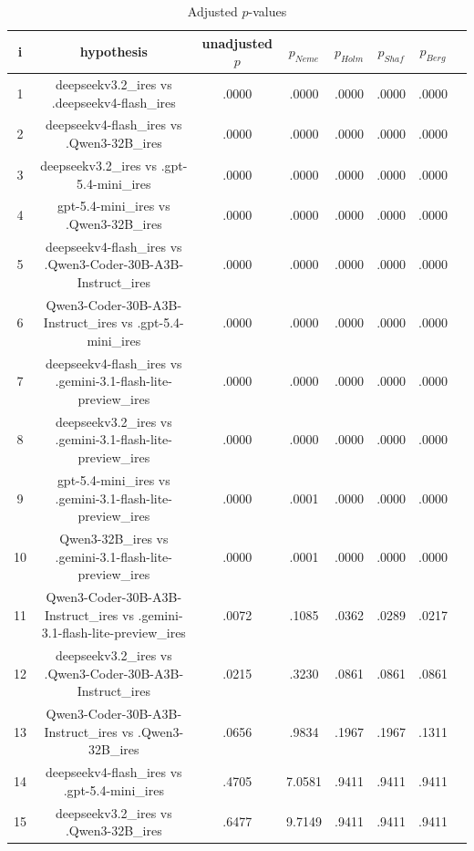 \documentclass[a4paper,10pt]{article}
\begin{document}
\begin{landscape}
\begin{table}[!htp]
\centering\tiny
\caption{Adjusted $p$-values}
\begin{tabular}{cccccccc}
i&hypothesis&unadjusted $p$&$p_{Neme}$&$p_{Holm}$&$p_{Shaf}$&$p_{Berg}$\\
\hline
1&deepseekv3.2_ires vs .deepseekv4-flash_ires&.0000&.0000&.0000&.0000&.0000\\2&deepseekv4-flash_ires vs .Qwen3-32B_ires&.0000&.0000&.0000&.0000&.0000\\3&deepseekv3.2_ires vs .gpt-5.4-mini_ires&.0000&.0000&.0000&.0000&.0000\\4&gpt-5.4-mini_ires vs .Qwen3-32B_ires&.0000&.0000&.0000&.0000&.0000\\5&deepseekv4-flash_ires vs .Qwen3-Coder-30B-A3B-Instruct_ires&.0000&.0000&.0000&.0000&.0000\\6&Qwen3-Coder-30B-A3B-Instruct_ires vs .gpt-5.4-mini_ires&.0000&.0000&.0000&.0000&.0000\\7&deepseekv4-flash_ires vs .gemini-3.1-flash-lite-preview_ires&.0000&.0000&.0000&.0000&.0000\\8&deepseekv3.2_ires vs .gemini-3.1-flash-lite-preview_ires&.0000&.0000&.0000&.0000&.0000\\9&gpt-5.4-mini_ires vs .gemini-3.1-flash-lite-preview_ires&.0000&.0001&.0000&.0000&.0000\\10&Qwen3-32B_ires vs .gemini-3.1-flash-lite-preview_ires&.0000&.0001&.0000&.0000&.0000\\11&Qwen3-Coder-30B-A3B-Instruct_ires vs .gemini-3.1-flash-lite-preview_ires&.0072&.1085&.0362&.0289&.0217\\12&deepseekv3.2_ires vs .Qwen3-Coder-30B-A3B-Instruct_ires&.0215&.3230&.0861&.0861&.0861\\13&Qwen3-Coder-30B-A3B-Instruct_ires vs .Qwen3-32B_ires&.0656&.9834&.1967&.1967&.1311\\14&deepseekv4-flash_ires vs .gpt-5.4-mini_ires&.4705&7.0581&.9411&.9411&.9411\\15&deepseekv3.2_ires vs .Qwen3-32B_ires&.6477&9.7149&.9411&.9411&.9411\\\hline
\end{tabular}
\end{table}

\end{landscape}
\end{document}
